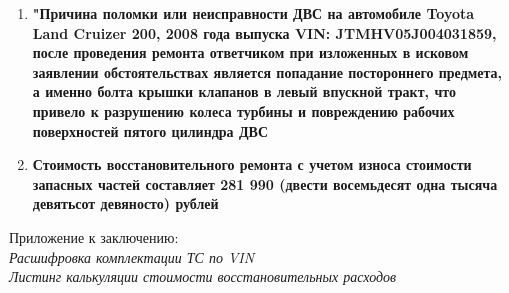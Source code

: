 \begin{enumerate}
	\item \textbf{"Причина поломки или неисправности ДВС на автомобиле Toyota Land Cruizer 200, 2008 года выпуска VIN: JTMHV05J004031859, после проведения ремонта ответчиком при изложенных в исковом заявлении обстоятельствах является попадание постороннего предмета, а именно болта крышки клапанов в левый впускной тракт, что привело к разрушению колеса турбины и повреждению рабочих поверхностей пятого цилиндра ДВС}
	
	\vspace{5mm}
	
	\item \textbf{ Стоимость восстановительного ремонта с учетом износа стоимости запасных частей составляет 281 990 (двести восемьдесят одна тысяча девятьсот девяносто) рублей}
\end{enumerate}
\vspace{15mm}
\relax
Приложение к заключению:\\
\textit{
	Расшифровка комплектации ТС по VIN \\
	Листинг калькуляции стоимости восстановительных расходов\\
}

\vspace{20mm}

